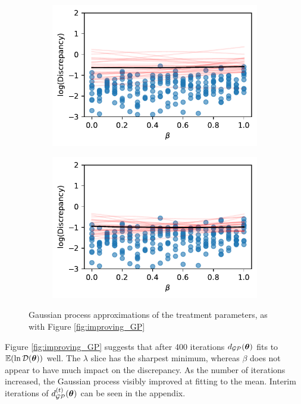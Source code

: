 \begin{figure}[htbp]
\begin{subfigure}[b]{0.5\textwidth}
        \includegraphics[width=\textwidth]{
            ../champagne_GP_images/initial_beta_slice_log_discrep.pdf
        }
    \end{subfigure}%
    \hfill%
    \begin{subfigure}[b]{0.5\textwidth}
        \centering
        \includegraphics[width=\textwidth]{
            ../champagne_GP_images/beta_slice_400_bolfi_updates_log_discrep.pdf
        }
    \end{subfigure}
    \caption[{
        Initial and final regressed Gaussian processes for both
        treatment parameters
    }]{
        Gaussian process approximations of the treatment parameters, as with
        Figure \ref{fig:improving_GP}
    }
    \label{fig:treatment_GP_fig}
\end{figure}

Figure \ref{fig:improving_GP} suggests that after 400 iterations
$d_{\mathcal{GP}}(\bm{\theta})$ fits to $\operatorname{\mathbb{E}}(\ln\mathcal{D}(\bm{\theta}))$ well.
The $\lambda$ slice has the sharpest minimum, whereas $\beta$
does not appear to have much impact on the discrepancy.
As the number of iterations increased, the Gaussian process visibly
improved at fitting to the mean. Interim iterations of $d^{(t)}_{\mathcal{GP}}(\bm{\theta})$
can be seen in the appendix.

